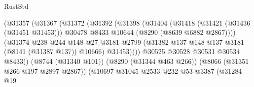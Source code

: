 \begin{lexlean}{RustStd}
\begin{coremodule}
                                            (@31357
                                              (@31367
                                                (@31372
                                                  (@31392
                                                    (@31398
                                                      (@31404
                                                        (@31418
                                                          (@31421 (@31436 (@31451 @31453)))
                                                          @30478
                                                          @8433
                                                          @10644
                                                          (@8290 (@8639 @6882 @2867))))
                                                      (@31374
                                                        @238
                                                        @244
                                                        @148
                                                        @27
                                                        @3181
                                                        @2799
                                                        (@31382
                                                          @137
                                                          @148
                                                          @137
                                                          @3181
                                                          (@8141 (@31387 @137))
                                                          @10666)
                                                        @31453))))
                                                @30525
                                                @30528
                                                @30531
                                                @30534
                                                @8433))
                                            (@8744 (@31340 @101))
                                            (@8290 (@31344 @463 @266))
                                            (@8066 (@31351 @266 @197 @2897 @2867))
                                            (@10697
                                              @31045
                                              @2533
                                              @232
                                              @53
                                              @3387
                                              (@31284
                                                @19

\end{coremodule}
\end{lexlean}
